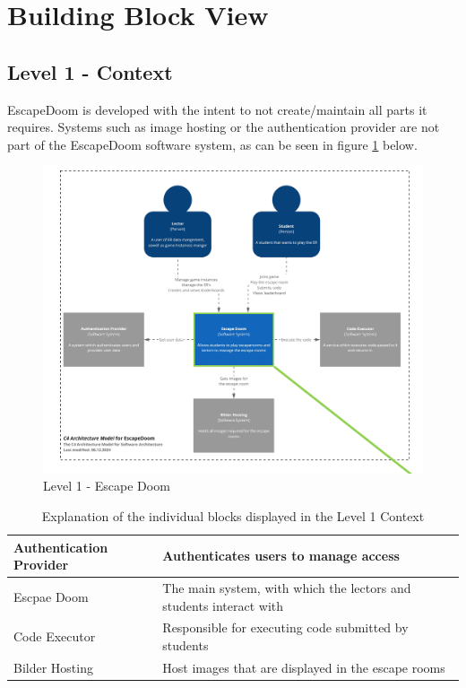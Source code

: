 \hypertarget{section-building-block-view}{%
\section{Building Block View}\label{section-building-block-view}}

\subsection{Level 1 - Context}\label{sub:5:l1}

EscapeDoom is developed with the intent to not create/maintain all parts it requires. Systems such as image hosting or the authentication provider are not part of the EscapeDoom software system, as can be seen in figure \ref{fig:c4:c1} below.

\begin{figure}
    \centering
    \includegraphics[width=1\linewidth]{images/C4/C1 - EscapeDoom.jpg}
    \caption{Level 1 - Escape Doom}
    \label{fig:c4:c1}
\end{figure}

\begin{table}[h!tbp]
    \centering
    \begin{tabularx}{1\textwidth} {
        | >{\raggedright\arraybackslash}X
        | >{\raggedleft\arraybackslash}X | }
        \hline
        Authentication Provider & Authenticates users to manage access \\
        \hline
        Escpae Doom & The main system, with which the lectors and students interact with \\
        \hline
        Code Executor & Responsible for executing code submitted by students \\
        \hline
        Bilder Hosting & Host images that are displayed in the escape rooms \\
        \hline
    \end{tabularx}
    \caption{Explanation of the individual blocks displayed in the Level 1 Context}
    \label{tab:c4:c1}
\end{table}

